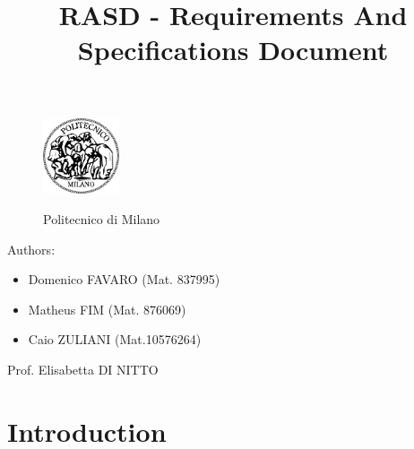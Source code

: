 \documentclass[a4paper]{article}
\title{RASD - Requirements And Specifications Document}
\begin{document}
\begin{titlepage}
\begin{figure}
\centering
\includegraphics[width=0.2\textwidth]{polimi.jpg}
\par
\LARGE Politecnico di Milano
\end{figure}


\maketitle
\raggedright
Authors:
\begin{itemize}
	\item Domenico FAVARO (Mat. 837995)
        	\item Matheus FIM (Mat. 876069)
	\item Caio ZULIANI (Mat.10576264)	
\end{itemize}
\raggedleft
Prof. Elisabetta DI NITTO
\thispagestyle{empty}
\end{titlepage}

\tableofcontents
\newpage
 
\section{Introduction}
\end{document}
